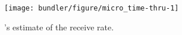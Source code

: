 \begin{figure}[t]
    \centering
\begin{knitrout}
\color{fgcolor}
\texttt{[image: bundler/figure/micro\_time-thru-1]} 

\end{knitrout}

    \caption{\name's estimate of the receive rate.}
    \label{fig:micro:time-thru}
\end{figure}
